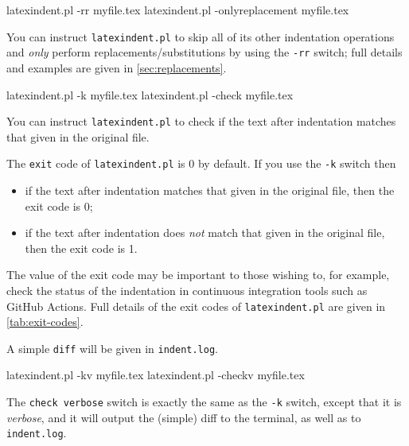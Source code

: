 \documentclass[10pt]{article}
\newcommand{\flagbox}[1]{%
 \par
 \makebox[30pt][l]{%
  \hspace{-1cm}%
  \ttfamily\fontseries{b}\selectfont #1
 }%
}
\begin{document}
 \begin{commandshell}
latexindent.pl -rr myfile.tex
latexindent.pl -onlyreplacement myfile.tex
\end{commandshell}

 You can  instruct
 \texttt{latexindent.pl} to skip all of its other indentation operations and \emph{only}
 perform replacements/substitutions by using the \texttt{-rr} switch; full details and
 examples are given in \vref{sec:replacements}.%

\flagbox{-k, --check}

 \begin{commandshell}
latexindent.pl -k myfile.tex
latexindent.pl -check myfile.tex
\end{commandshell}

 You can  instruct \texttt{latexindent.pl} to
 check if the text after indentation matches that given in the original file.%

 The \texttt{exit} code  of \texttt{latexindent.pl} is 0 by default. If
 you use the \texttt{-k} switch then
 \begin{itemize}
  \item if the text after indentation matches that given in the original file, then the
        exit code is 0;
  \item if the text after indentation does \emph{not} match that given in the original
        file, then the exit code is 1.
 \end{itemize}

 The value of the exit code may be important to those wishing to, for example, check the
 status of the indentation in continuous integration tools such as GitHub Actions. Full
 details of the exit codes of \texttt{latexindent.pl} are given in \cref{tab:exit-codes}.

 A simple \texttt{diff} will be given in \texttt{indent.log}.

\flagbox{-kv, --checkv}

 \begin{commandshell}
latexindent.pl -kv myfile.tex
latexindent.pl -checkv myfile.tex
\end{commandshell}

  The \texttt{check verbose}
 switch is exactly the same as the \texttt{-k} switch, except that it is \emph{verbose},
 and it will output the (simple) diff to the terminal, as well as to \texttt{indent.log}.
\end{document}
